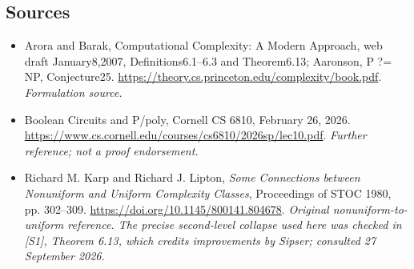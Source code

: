 \documentclass[11pt]{article}
\begin{document}
\subsection{Sources}
\begin{itemize}
\item[S1]Arora and Barak, Computational Complexity: A Modern Approach, web draft January8,2007, Definitions6.1–6.3 and Theorem6.13; Aaronson, P ?= NP, Conjecture25.
\url{https://theory.cs.princeton.edu/complexity/book.pdf}.
\textit{Formulation source.}
\item[S2]Boolean Circuits and P/poly, Cornell CS 6810, February 26, 2026.
\url{https://www.cs.cornell.edu/courses/cs6810/2026sp/lec10.pdf}.
\textit{Further reference; not a proof endorsement.}
\item[E1]Richard M. Karp and Richard J. Lipton,
\emph{Some Connections between Nonuniform and Uniform Complexity Classes},
Proceedings of STOC 1980, pp. 302--309.
\url{https://doi.org/10.1145/800141.804678}.
\textit{Original nonuniform-to-uniform reference. The precise second-level
collapse used here was checked in [S1], Theorem 6.13, which credits
improvements by Sipser; consulted 27 September 2026.}
\end{itemize}
\end{document}

